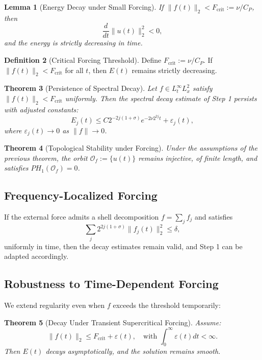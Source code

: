 \documentclass[11pt]{article}
\newtheorem{theorem}{Theorem}[section]
\newtheorem{lemma}[theorem]{Lemma}
\theoremstyle{definition}
\newtheorem{definition}[theorem]{Definition}
\begin{document}
\begin{lemma}[Energy Decay under Small Forcing]
If $\|f(t)\|_2 < F_{\mathrm{crit}} := \nu / C_P$, then
\[
\frac{d}{dt} \|u(t)\|_2^2 < 0,
\]
and the energy is strictly decreasing in time.
\end{lemma}

\begin{definition}[Critical Forcing Threshold]
Define $F_{\mathrm{crit}} := \nu / C_P$. If $\|f(t)\|_2 < F_{\mathrm{crit}}$ for all $t$, then $E(t)$ remains strictly decreasing.
\end{definition}

\begin{theorem}[Persistence of Spectral Decay]
Let $f \in L^\infty_t L^2_x$ satisfy $\|f(t)\|_2 < F_{\mathrm{crit}}$ uniformly. Then the spectral decay estimate of Step 1 persists with adjusted constants:
\[
E_j(t) \le C 2^{-2j(1+\sigma)} e^{-2\nu 2^{2j}t} + \varepsilon_j(t),
\]
where $\varepsilon_j(t) \to 0$ as $\|f\| \to 0$.
\end{theorem}

\begin{theorem}[Topological Stability under Forcing]
Under the assumptions of the previous theorem, the orbit $\mathcal{O}_f := \{ u(t) \}$ remains injective, of finite length, and satisfies $PH_1(\mathcal{O}_f) = 0$.
\end{theorem}

\subsection*{Frequency-Localized Forcing}
If the external force admits a shell decomposition $f = \sum_j f_j$ and satisfies
\[
\sum_j 2^{2j(1+\sigma)} \|f_j(t)\|_2^2 \le \delta,
\]
uniformly in time, then the decay estimates remain valid, and Step 1 can be adapted accordingly.

\subsection*{Robustness to Time-Dependent Forcing}
We extend regularity even when $f$ exceeds the threshold temporarily:

\begin{theorem}[Decay Under Transient Supercritical Forcing]
Assume:
\[
\|f(t)\|_2 \le F_{\mathrm{crit}} + \varepsilon(t), \quad \text{with } \int_0^\infty \varepsilon(t) dt < \infty.
\]
Then $E(t)$ decays asymptotically, and the solution remains smooth.
\end{theorem}
\end{document}
